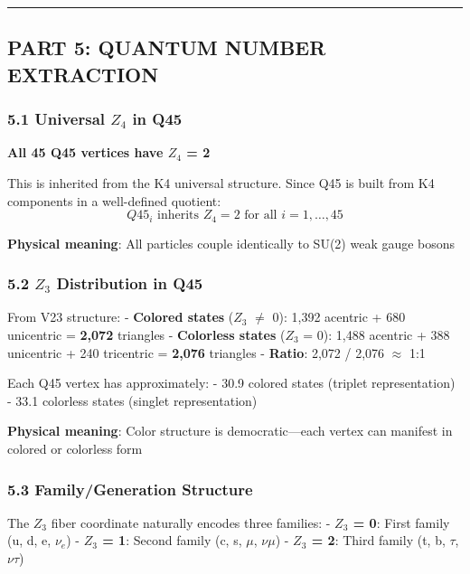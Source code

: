 \documentclass[11pt]{article}
\begin{document}
\begin{center}\rule{0.5\linewidth}{0.5pt}\end{center}

\subsection{PART 5: QUANTUM NUMBER
EXTRACTION}\label{part-5-quantum-number-extraction}

\subsubsection{\texorpdfstring{5.1 Universal \(Z_{4}\) in
Q45}{5.1 Universal Z\_\{4\} in Q45}}\label{universal-z_4-in-q45}

\textbf{All 45 Q45 vertices have \(Z_{4}\) = 2}

This is inherited from the K4 universal structure. Since Q45 is built
from K4 components in a well-defined quotient:
\[Q45_i \text{ inherits } Z_4 = 2 \text{ for all } i = 1, \ldots, 45\]

\textbf{Physical meaning}: All particles couple identically to SU(2)
weak gauge bosons

\subsubsection{\texorpdfstring{5.2 \(Z_{3}\) Distribution in
Q45}{5.2 Z\_\{3\} Distribution in Q45}}\label{z_3-distribution-in-q45}

From V23 structure: - \textbf{Colored states} (\(Z_{3}\)
\ensuremath{\neq} 0): 1,392 acentric + 680 unicentric = \textbf{2,072}
triangles - \textbf{Colorless states} (\(Z_{3}\) = 0): 1,488 acentric +
388 unicentric + 240 tricentric = \textbf{2,076} triangles -
\textbf{Ratio}: 2,072 / 2,076 \ensuremath{\approx} 1:1

Each Q45 vertex has approximately: - 30.9 colored states (triplet
representation) - 33.1 colorless states (singlet representation)

\textbf{Physical meaning}: Color structure is democratic---each vertex
can manifest in colored or colorless form

\subsubsection{5.3 Family/Generation
Structure}\label{familygeneration-structure}

The \(Z_{3}\) fiber coordinate naturally encodes three families: -
\textbf{\(Z_{3}\) = 0}: First family (u, d, e, \(\ensuremath{\nu}_{e}\))
- \textbf{\(Z_{3}\) = 1}: Second family (c, s, \ensuremath{\mu},
\ensuremath{\nu}\ensuremath{\mu}) - \textbf{\(Z_{3}\) = 2}: Third family
(t, b, \ensuremath{\tau}, \ensuremath{\nu}\ensuremath{\tau})
\end{document}
